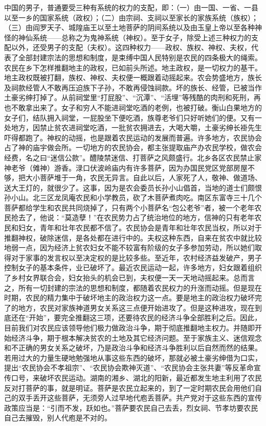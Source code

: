 中国的男子，普通要受三种有系统的权力的支配，即：（一）由一国、一省、一县以至一乡的国家系统（政权）；（二）由宗祠、支祠以至家长的家族系统（族权）；（三）由阎罗天子、城隍庙王以至土地菩萨的阴间系统以及由玉皇上帝以至各种神怪的神仙系统——总称之为鬼神系统（神权）。至于女子，除受上述三种权力的支配以外，还受男子的支配（夫权）。这四种权力——政权、族权、神权、夫权，代表了全部封建宗法的思想和制度，是束缚中国人民特别是农民的四条极大的绳索。农民在乡下怎样推翻地主的政权，已如前头所述。地主政权，是一切权力的基干。地主政权既被打翻，族权、神权、夫权便一概跟着动摇起来。农会势盛地方，族长及祠款经管人不敢再压迫族下子孙，不敢再侵蚀祠款。坏的族长、经管，已被当作土豪劣绅打掉了。从前祠堂里“打屁股”、“沉潭”、“活埋”等残酷的肉刑和死刑，再也不敢拿出来了。女子和穷人不能进祠堂吃酒的老例，也被打破。衡山白果地方的女子们，结队拥入祠堂，一屁股坐下便吃酒，族尊老爷们只好听她们的便。又有一处地方，因禁止贫农进祠堂吃酒，一批贫农拥进去，大喝大嚼，土豪劣绅长褂先生吓得都跑了。神权的动摇，也是跟着农民运动的发展而普遍。许多地方，农民协会占了神的庙宇做会所。一切地方的农民协会，都主张提取庙产办农民学校，做农会经费，名之曰“迷信公款”。醴陵禁迷信、打菩萨之风颇盛行。北乡各区农民禁止家神老爷（傩神）游香。渌口伏波岭庙内有许多菩萨，因为办国民党区党部房屋不够，把大小菩萨堆于一角，农民无异言。自此以后，人家死了人，敬神、做道场、送大王灯的，就很少了。这事，因为是农会委员长孙小山倡首，当地的道士们颇恨孙小山。北三区龙凤庵农民和小学教员，砍了木菩萨煮肉吃。南区东富寺三十几个菩萨都给学生和农民共同烧掉了，只有两个小菩萨名“包公老爷”者，被一个老年农民抢去了，他说：“莫造孽！”在农民势力占了统治地位的地方，信神的只有老年农民和妇女，青年和壮年农民都不信了。农民协会是青年和壮年农民当权，所以对于推翻神权，破除迷信，是各处都在进行中的。夫权这种东西，自来在贫农中就比较地弱一点，因为经济上贫农妇女不能不较富有阶级的女子多参加劳动，所以她们取得对于家事的发言权以至决定权的是比较多些。至近年，农村经济益发破产，男子控制女子的基本条件，业已破坏了。最近农民运动一起，许多地方，妇女跟着组织了乡村女界联合会，妇女抬头的机会已到，夫权便一天一天地动摇起来。总而言之，所有一切封建的宗法的思想和制度，都随着农民权力的升涨而动摇。但是现在时期，农民的精力集中于破坏地主的政治权力这一点。要是地主的政治权力破坏完了的地方，农民对家族神道男女关系这三点便开始进攻了。但是这种进攻，现在到底还在“开始”，要完全推翻这三项，还要待农民的经济斗争全部胜利之后。因此，目前我们对农民应该领导他们极力做政治斗争，期于彻底推翻地主权力。并随即开始经济斗争，期于根本解决贫农的土地及其它经济问题。至于家族主义、迷信观念和不正确的男女关系之破坏，乃是政治斗争和经济斗争胜利以后自然而然的结果。若用过大的力量生硬地勉强地从事这些东西的破坏，那就必被土豪劣绅借为口实，提出“农民协会不孝祖宗”、“农民协会欺神灭道”、“农民协会主张共妻”等反革命宣传口号，来破坏农民运动。湖南的湘乡、湖北的阳新，最近都发生地主利用了农民反对打菩萨的事，就是明证。菩萨是农民立起来的，到了一定时期农民会用他们自己的双手丢开这些菩萨，无须旁人过早地代庖丢菩萨。共产党对于这些东西的宣传政策应当是：“引而不发，跃如也。”菩萨要农民自己去丢，烈女祠、节孝坊要农民自己去摧毁，别人代庖是不对的。

